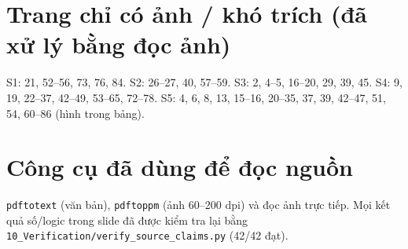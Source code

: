 \documentclass[
  10pt,
  twoside,openany]{book}
\begin{document}
\hypertarget{trang-chux1ec9-cuxf3-ux1ea3nh-khuxf3-truxedch-ux111uxe3-xux1eed-luxfd-bux1eb1ng-ux111ux1ecdc-ux1ea3nh}{%
\section{Trang chỉ có ảnh / khó trích (đã xử lý bằng đọc
ảnh)}\label{trang-chux1ec9-cuxf3-ux1ea3nh-khuxf3-truxedch-ux111uxe3-xux1eed-luxfd-bux1eb1ng-ux111ux1ecdc-ux1ea3nh}}

S1: 21, 52--56, 73, 76, 84. S2: 26--27, 40, 57--59. S3: 2, 4--5, 16--20,
29, 39, 45. S4: 9, 19, 22--37, 42--49, 53--65, 72--78. S5: 4, 6, 8, 13,
15--16, 20--35, 37, 39, 42--47, 51, 54, 60--86 (hình trong bảng).

\hypertarget{cuxf4ng-cux1ee5-ux111uxe3-duxf9ng-ux111ux1ec3-ux111ux1ecdc-nguux1ed3n}{%
\section{Công cụ đã dùng để đọc
nguồn}\label{cuxf4ng-cux1ee5-ux111uxe3-duxf9ng-ux111ux1ec3-ux111ux1ecdc-nguux1ed3n}}

\texttt{pdftotext} (văn bản), \texttt{pdftoppm} (ảnh 60--200 dpi) và đọc
ảnh trực tiếp. Mọi kết quả số/logic trong slide đã được kiểm tra lại
bằng \texttt{10\_Verification/verify\_source\_claims.py} (42/42 đạt).

\backmatter
\end{document}
